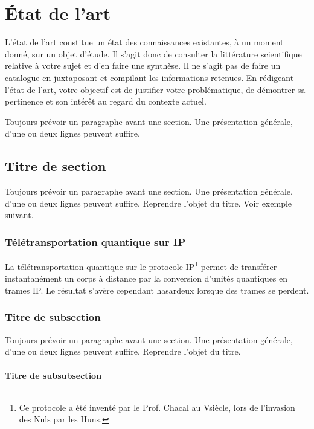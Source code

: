 \documentclass[a4paper,11pt]{book}
\begin{document}
\chapter{État de l'art}

L'état de l'art constitue un état des connaissances existantes, à un
moment donné, sur un objet d'étude. Il s'agit donc de consulter la
littérature scientifique relative à votre sujet et d'en faire une
synthèse. Il ne s'agit pas de faire un \og catalogue \fg{} en
juxtaposant et compilant les informations retenues. En rédigeant
l'état de l'art, votre objectif est de justifier votre problématique,
de démontrer sa pertinence et son intérêt au regard du contexte
actuel.

Toujours prévoir un paragraphe avant une section. Une présentation
générale, d'une ou deux lignes peuvent suffire.

\section{Titre de section}

Toujours prévoir un paragraphe avant une section. Une présentation
générale, d'une ou deux lignes peuvent suffire. Reprendre l'objet du
titre. Voir exemple suivant.

\subsection{Télétransportation quantique sur IP}

La télétransportation quantique sur le protocole IP\footnote{Ce
  protocole a été inventé par le Prof. Chacal au V\ieme siècle, lors de
  l'invasion des Nuls par les Huns.} permet de transférer
instantanément un corps à distance par la conversion d'unités
quantiques en trames IP. Le résultat s'avère cependant hasardeux
lorsque des trames se perdent.

\subsection{Titre de subsection}

Toujours prévoir un paragraphe avant une section. Une présentation
générale, d'une ou deux lignes peuvent suffire. Reprendre l'objet du
titre.


\subsubsection{Titre de subsubsection}
\end{document}
